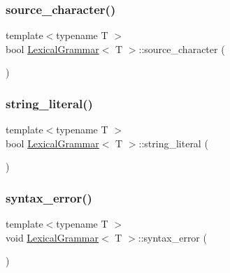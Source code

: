 \mbox{\label{class_lexical_grammar_ad3f57a97b726239f8561556e2c920c09}} 
\subsubsection{\texorpdfstring{source\+\_\+character()}{source\_character()}}
{\footnotesize\ttfamily template$<$typename T $>$ \\
bool \hyperlink{class_lexical_grammar}{Lexical\+Grammar}$<$ T $>$\+::source\+\_\+character (\begin{DoxyParamCaption}{ }\end{DoxyParamCaption})\hspace{0.3cm}{\ttfamily [inline]}}

\mbox{\label{class_lexical_grammar_a11294149e962d00a92cacc8c6567cdc5}} 
\subsubsection{\texorpdfstring{string\+\_\+literal()}{string\_literal()}}
{\footnotesize\ttfamily template$<$typename T $>$ \\
bool \hyperlink{class_lexical_grammar}{Lexical\+Grammar}$<$ T $>$\+::string\+\_\+literal (\begin{DoxyParamCaption}{ }\end{DoxyParamCaption})\hspace{0.3cm}{\ttfamily [inline]}}

\mbox{\label{class_lexical_grammar_acccc5eb7a8e4f460f4123049889d8e4b}} 
\subsubsection{\texorpdfstring{syntax\+\_\+error()}{syntax\_error()}}
{\footnotesize\ttfamily template$<$typename T $>$ \\
void \hyperlink{class_lexical_grammar}{Lexical\+Grammar}$<$ T $>$\+::syntax\+\_\+error (\begin{DoxyParamCaption}{ }\end{DoxyParamCaption})\hspace{0.3cm}{\ttfamily [inline]}}

